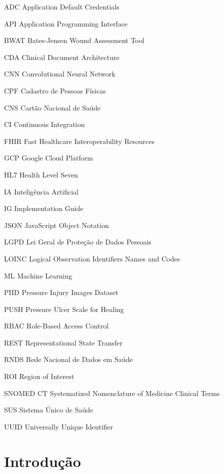 \documentclass[
    12pt,
    openright,
    oneside,
    a4paper,
    chapter=TITLE,
    section=TITLE,
    brazil,
    sumario=tradicional,
    hidelinks
]{abntex2}
\begin{document}
\begin{siglas}
    \item[ADC] Application Default Credentials
    \item[API] Application Programming Interface
    \item[BWAT] Bates-Jensen Wound Assessment Tool
    \item[CDA] Clinical Document Architecture
    \item[CNN] Convolutional Neural Network
    \item[CPF] Cadastro de Pessoas F\'isicas
    \item[CNS] Cart\~ao Nacional de Sa\'ude
    \item[CI] Continuous Integration
    \item[FHIR] Fast Healthcare Interoperability Resources
    \item[GCP] Google Cloud Platform
    \item[HL7] Health Level Seven
    \item[IA] Intelig\^encia Artificial
    \item[IG] Implementation Guide
    \item[JSON] JavaScript Object Notation
    \item[LGPD] Lei Geral de Prote\c{c}\~ao de Dados Pessoais
    \item[LOINC] Logical Observation Identifiers Names and Codes
    \item[ML] Machine Learning
    \item[PIID] Pressure Injury Images Dataset
    \item[PUSH] Pressure Ulcer Scale for Healing
    \item[RBAC] Role-Based Access Control
    \item[REST] Representational State Transfer
    \item[RNDS] Rede Nacional de Dados em Sa\'ude
    \item[ROI] Region of Interest
    \item[SNOMED CT] Systematized Nomenclature of Medicine Clinical Terms
    \item[SUS] Sistema \'Unico de Sa\'ude
    \item[UUID] Universally Unique Identifier
\end{siglas}

\tableofcontents*
\cleardoublepage

\textual

\chapter{Introdu\c{c}\~ao}
\end{document}
